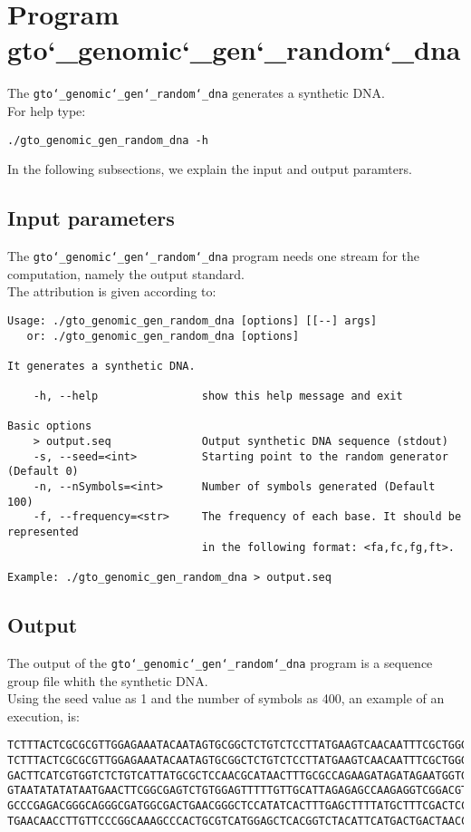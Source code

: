 \section{Program gto\char`_genomic\char`_gen\char`_random\char`_dna}
The \texttt{gto\char`_genomic\char`_gen\char`_random\char`_dna} generates a synthetic DNA.\\
For help type:
\begin{lstlisting}
./gto_genomic_gen_random_dna -h
\end{lstlisting}
In the following subsections, we explain the input and output paramters.

\subsection*{Input parameters}

The \texttt{gto\char`_genomic\char`_gen\char`_random\char`_dna} program needs one stream for the computation,
namely the output standard.\\
The attribution is given according to:
\begin{lstlisting}
Usage: ./gto_genomic_gen_random_dna [options] [[--] args]
   or: ./gto_genomic_gen_random_dna [options]

It generates a synthetic DNA.

    -h, --help                show this help message and exit

Basic options
    > output.seq              Output synthetic DNA sequence (stdout)
    -s, --seed=<int>          Starting point to the random generator (Default 0)
    -n, --nSymbols=<int>      Number of symbols generated (Default 100)
    -f, --frequency=<str>     The frequency of each base. It should be represented 
    						  in the following format: <fa,fc,fg,ft>.

Example: ./gto_genomic_gen_random_dna > output.seq
\end{lstlisting}

\subsection*{Output}
The output of the \texttt{gto\char`_genomic\char`_gen\char`_random\char`_dna} program is a sequence group file whith the synthetic DNA.\\
Using the seed value as 1 and the number of symbols as 400, an example of an execution, is: 
\begin{lstlisting}
TCTTTACTCGCGCGTTGGAGAAATACAATAGTGCGGCTCTGTCTCCTTATGAAGTCAACAATTTCGCTGGGACTTGCGGC
TCTTTACTCGCGCGTTGGAGAAATACAATAGTGCGGCTCTGTCTCCTTATGAAGTCAACAATTTCGCTGGGACTTGCGGC
GACTTCATCGTGGTCTCTGTCATTATGCGCTCCAACGCATAACTTTGCGCCAGAAGATAGATAGAATGGTGTAAGAAACT
GTAATATATATAATGAACTTCGGCGAGTCTGTGGAGTTTTTGTTGCATTAGAGAGCCAAGAGGTCGGACGTCCTCACGTA
GCCCGAGACGGGCAGGGCGATGGCGACTGAACGGGCTCCATATCACTTTGAGCTTTTATGCTTTCGACTCCTCCAGGAGC
TGAACAACCTTGTTCCCGGCAAAGCCCACTGCGTCATGGAGCTCACGGTCTACATTCATGACTGACTAACCGTAAACTGC
\end{lstlisting}

